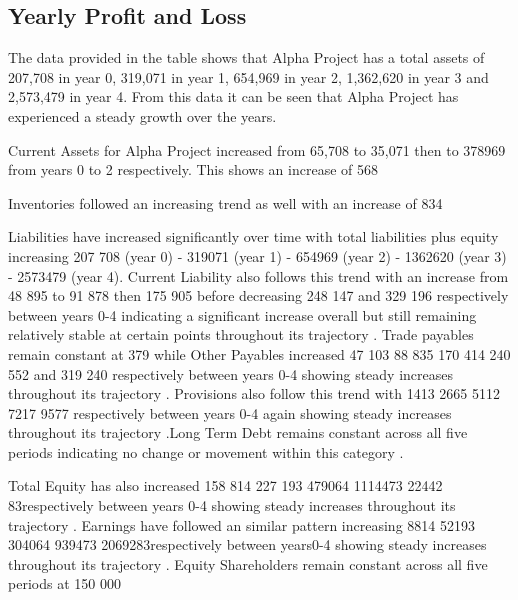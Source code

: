 

\subsection{Yearly Profit and Loss}\label{sec:title}
The data provided in the table shows that Alpha Project has a total assets of 207,708 in year 0, 319,071 in year 1, 654,969 in year 2, 1,362,620 in year 3 and 2,573,479 in year 4. From this data it can be seen that Alpha Project has experienced a steady growth over the years. 

Current Assets for Alpha Project increased from 65,708 to 35,071 then to 378969 from years 0 to 2 respectively. This shows an increase of 568%

Inventories followed an increasing trend as well with an increase of 834%

Liabilities have increased significantly over time with total liabilities plus equity increasing 207 708 (year 0) - 319071 (year 1) - 654969 (year 2) - 1362620 (year 3) - 2573479 (year 4). Current Liability also follows this trend with an increase from 48 895 to 91 878 then 175 905 before decreasing 248 147 and 329 196 respectively between years 0-4 indicating a significant increase overall but still remaining relatively stable at certain points throughout its trajectory .  Trade payables remain constant at 379 while Other Payables increased 47 103 88 835 170 414 240 552 and 319 240 respectively between years 0-4 showing steady increases throughout its trajectory . Provisions also follow this trend with 1413 2665 5112 7217 9577 respectively between years 0-4 again showing steady increases throughout its trajectory .Long Term Debt remains constant across all five periods indicating no change or movement within this category . 

 Total Equity has also increased 158 814 227 193 479064 1114473 22442 83respectively between years 0-4 showing steady increases throughout its trajectory . Earnings have followed an similar pattern increasing 8814 52193 304064 939473 2069283respectively between years0-4 showing steady increases throughout its trajectory . Equity Shareholders remain constant across all five periods at 150 000